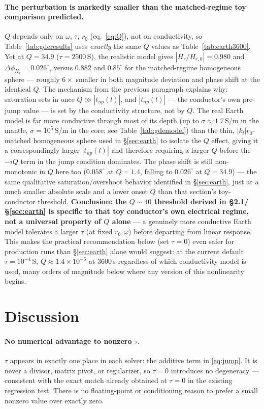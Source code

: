 \documentclass[11pt]{article}
\begin{document}
\paragraph{The perturbation is markedly smaller than the matched-regime toy comparison predicted.}
$Q$ depends only on $\omega$, $\tau$, $r_0$ (eq.~\ref{eq:Q}), not on conductivity, so
Table~\ref{tab:gderesults} uses \emph{exactly} the same $Q$ values as Table~\ref{tab:earth3600}. Yet
at $Q=34.9$ ($\tau=2500$\,S), the realistic model gives $|H_r/H_{r,0}|=0.980$ and
$\Delta\phi_{H_r}=0.026^\circ$, versus $0.882$ and $0.85^\circ$ for the matched-regime homogeneous
sphere --- roughly $6\times$ smaller in both magnitude deviation and phase shift at the identical
$Q$. The mechanism from the previous paragraph explains why: saturation sets in once
$Q\gg|t_{np}(l)|$, and $|t_{np}(l)|$ --- the conductor's own pre-jump value --- is set by the
conductivity structure, not by $Q$. The real Earth model is far more conductive through most of its
depth (up to $\sigma\approx1.7$\,S/m in the mantle, $\sigma=10^5$\,S/m in the core; see
Table~\ref{tab:gdemodel}) than the thin, $|k_l|r_0$-matched homogeneous sphere used in
\S\ref{sec:earth} to isolate the $Q$ effect, giving it a correspondingly larger $|t_{np}(l)|$ and
therefore requiring a larger $Q$ before the $-iQ$ term in the jump condition dominates. The phase
shift is still non-monotonic in $Q$ here too ($0.058^\circ$ at $Q=1.4$, falling to $0.026^\circ$ at
$Q=34.9$) --- the same qualitative saturation/overshoot behavior identified in \S\ref{sec:earth}, just
at a much smaller absolute scale and a lower onset $Q$ than that section's toy-conductor threshold.
\textbf{Conclusion: the $Q\sim40$ threshold derived in \S2.1/\S\ref{sec:earth} is specific to that toy
conductor's own electrical regime, not a universal property of $Q$ alone} --- a genuinely more
conductive Earth model tolerates a larger $\tau$ (at fixed $r_0,\omega$) before departing from linear
response. This makes the practical recommendation below (set $\tau=0$) even safer for production runs
than \S\ref{sec:earth} alone would suggest: at the current default $\tau=10^{-4}$\,S, $Q\approx1.4\times
10^{-6}$ at 3600\,s regardless of which conductivity model is used, many orders of magnitude below
where any version of this nonlinearity begins.

\section{Discussion}

\paragraph{No numerical advantage to nonzero $\tau$.} $\tau$ appears in exactly one place in each
solver: the additive term in \eqref{eq:jump}. It is never a divisor, matrix pivot, or regularizer, so
$\tau=0$ introduces no degeneracy --- consistent with the exact match already obtained at
$\tau=0$ in the existing regression test. There is no floating-point or conditioning reason to
prefer a small nonzero value over exactly zero.
\end{document}
